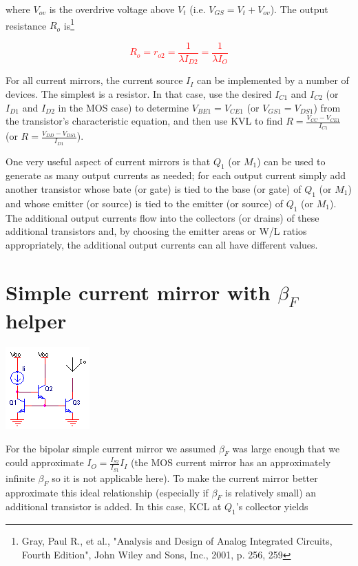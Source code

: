 where $V_{ov}$ is the overdrive voltage above $V_{t}$ (i.e. $V_{GS} = V_{t} + V_{ov}$). The output resistance $R_{o}$ is\footnote{Gray, Paul R., et al., "Analysis and Design of Analog Integrated Circuits, Fourth Edition", John Wiley and Sons, Inc., 2001, p. 256, 259}

\textcolor{red}{
\begin{equation}
R_{o} = r_{o2} = \frac{1}{\lambda I_{D2}} = \frac{1}{\lambda I_{O}}
\label{eq:MOSsimplecurrentmirror_Ro}
\end{equation}
}

\par
For all current mirrors, the current source $I_{I}$ can be implemented by a number of devices. The simplest is a resistor. In that case, use the desired $I_{C1}$ and $I_{C2}$ (or $I_{D1}$ and $I_{D2}$ in the MOS case) to determine $V_{BE1} = V_{CE1}$ (or $V_{GS1} = V_{DS1}$) from the transistor's characteristic equation, and then use KVL to find $R = \frac{V_{CC} - V_{CE1}}{I_{C1}}$ (or $R = \frac{V_{DD} - V_{DS1}}{I_{D1}}$).
\par
One very useful aspect of current mirrors is that $Q_{1}$ (or $M_{1}$) can be used to generate as many output currents as needed; for each output current simply add another transistor whose bate (or gate) is tied to the base (or gate) of $Q_{1}$ (or $M_{1}$) and whose emitter (or source) is tied to the emitter (or source) of $Q_{1}$ (or $M_{1}$). The additional output currents flow into the collectors (or drains) of these additional transistors and, by choosing the emitter areas or W/L ratios appropriately, the additional output currents can all have different values.

\section{Simple current mirror with $\beta_{F}$ helper}
\begin{center}
	\includegraphics{schematics/currentmirrorbetahelper.PNG}
\end{center}
For the bipolar simple current mirror we assumed $\beta_{F}$ was large enough that we could approximate $I_{O} = \frac{I_{S2}}{I_{S1}}I_{I}$ (the MOS current mirror has an approximately infinite $\beta_{F}$ so it is not applicable here). To make the current mirror better approximate this ideal relationship (especially if $\beta_{F}$ is relatively small) an additional transistor is added. In this case, KCL at $Q_{1}$'s collector yields

